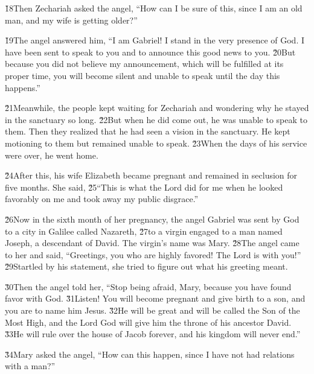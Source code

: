 \v{18}Then Zechariah asked the angel, ``How can I be sure of this, since I am an old man, and my wife is getting older?''

\v{19}The angel answered him, ``I am Gabriel! I stand in the very presence of God. I have been sent to speak to you and to announce this good news to you. \v{20}But because you did not believe my announcement, which will be fulfilled at its proper time, you will become silent and unable to speak until the day this happens.''

\v{21}Meanwhile, the people kept waiting for Zechariah and wondering why he stayed in the sanctuary so long. \v{22}But when he did come out, he was unable to speak to them. Then they realized that he had seen a vision in the sanctuary. He kept motioning to them but remained unable to speak. \v{23}When the days of his service were over, he went home.

\v{24}After this, his wife Elizabeth became pregnant and remained in seclusion for five months. She said, \v{25}``This is what the Lord did for me when he looked favorably on me and took away my public disgrace.''

\v{26}Now in the sixth month of her pregnancy, the angel Gabriel was sent by God to a city in Galilee called Nazareth, \v{27}to a virgin engaged to a man named Joseph, a descendant of David. The virgin's name was Mary. \v{28}The angel came to her and said, ``Greetings, you who are highly favored! The Lord is with you!'' \v{29}Startled by his statement, she tried to figure out what his greeting meant.

\v{30}Then the angel told her, ``Stop being afraid, Mary, because you have found favor with God. \v{31}Listen! You will become pregnant and give birth to a son, and you are to name him Jesus. \v{32}He will be great and will be called the Son of the Most High, and the Lord God will give him the throne of his ancestor David. \v{33}He will rule over the house of Jacob forever, and his kingdom will never end.''

\v{34}Mary asked the angel, ``How can this happen, since I have not had relations with a man?''

